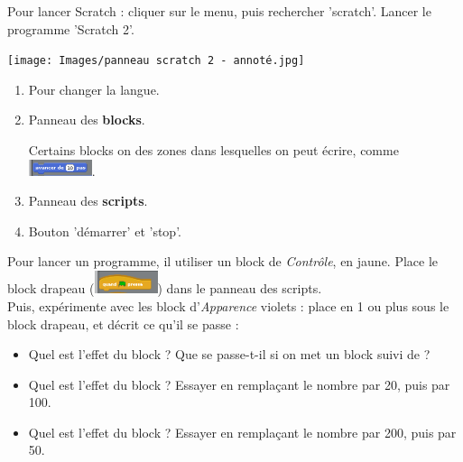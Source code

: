 \documentclass[a4paper,11pt]{article}
\begin{document}
\maketitle

\begin{greybox}[frametitle={Pour commencer}]
	Pour lancer Scratch : cliquer sur le menu, puis rechercher 'scratch'. Lancer le programme 'Scratch 2'.

	\texttt{[image: Images/panneau scratch 2 - annoté.jpg]}

	\begin{enumerate}
		\item Pour changer la langue.
		\item Panneau des \textbf{blocks}.

		      Certains blocks on des zones dans lesquelles on peut écrire, comme \includegraphics[width=5em]{Images/Block avancer de 10 pas.png}.
		\item Panneau des \textbf{scripts}.
		\item Bouton 'démarrer' et 'stop'.
	\end{enumerate}
\end{greybox}

\begin{exercice}
	Pour lancer un programme, il  utiliser un block de \textit{Contrôle}, en jaune. Place le block drapeau (\includegraphics[width=5em]{Images/Block drapeau.png}) dans le panneau des scripts. \\

	Puis, expérimente avec les block d'\textit{Apparence} violets : place en 1 ou plus sous le block drapeau, et décrit ce qu'il se passe :
	\begin{itemize}
		\item Quel est l'effet du block  ? Que se passe-t-il si on met un block  suivi de  ? \vspace{0.5em}

		      \dotfill
		\item Quel est l'effet du block  ? Essayer en remplaçant le nombre par 20, puis par 100. \vspace{0.5em}

		      \dotfill
		\item Quel est l'effet du block  ? Essayer en remplaçant le nombre par 200, puis par 50. \vspace{0.5em}

		      \dotfill
	\end{itemize}
\end{exercice}
\end{document}
